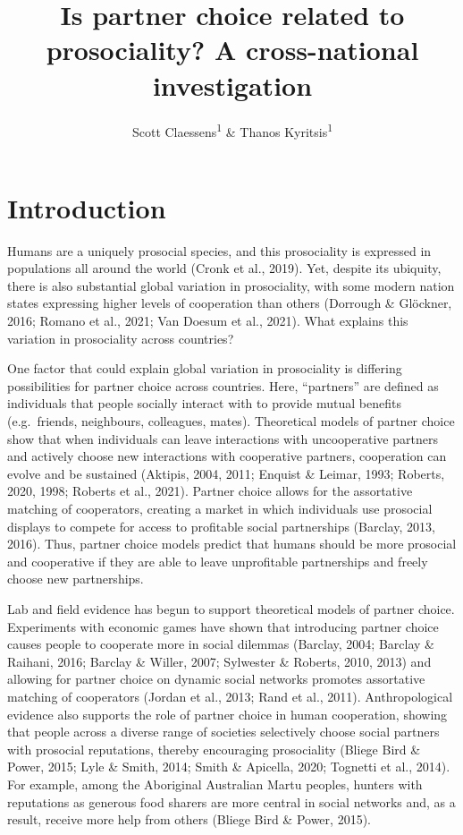 \documentclass[english,man,floatsintext]{apa6}
\title{Is partner choice related to prosociality? A cross-national investigation}
\author{Scott Claessens\textsuperscript{1} \& Thanos Kyritsis\textsuperscript{1}}
\date{}
\affiliation{\vspace{0.5cm}\textsuperscript{1} School of Psychology, University of Auckland, Auckland, New Zealand}
\begin{document}
\maketitle

\hypertarget{introduction}{%
\section{Introduction}\label{introduction}}

Humans are a uniquely prosocial species, and this prosociality is expressed in populations all around the world (Cronk et al., 2019). Yet, despite its ubiquity, there is also substantial global variation in prosociality, with some modern nation states expressing higher levels of cooperation than others (Dorrough \& Glöckner, 2016; Romano et al., 2021; Van Doesum et al., 2021). What explains this variation in prosociality across countries?

One factor that could explain global variation in prosociality is differing possibilities for partner choice across countries. Here, \enquote{partners} are defined as individuals that people socially interact with to provide mutual benefits (e.g.~friends, neighbours, colleagues, mates). Theoretical models of partner choice show that when individuals can leave interactions with uncooperative partners and actively choose new interactions with cooperative partners, cooperation can evolve and be sustained (Aktipis, 2004, 2011; Enquist \& Leimar, 1993; Roberts, 2020, 1998; Roberts et al., 2021). Partner choice allows for the assortative matching of cooperators, creating a market in which individuals use prosocial displays to compete for access to profitable social partnerships (Barclay, 2013, 2016). Thus, partner choice models predict that humans should be more prosocial and cooperative if they are able to leave unprofitable partnerships and freely choose new partnerships.

Lab and field evidence has begun to support theoretical models of partner choice. Experiments with economic games have shown that introducing partner choice causes people to cooperate more in social dilemmas (Barclay, 2004; Barclay \& Raihani, 2016; Barclay \& Willer, 2007; Sylwester \& Roberts, 2010, 2013) and allowing for partner choice on dynamic social networks promotes assortative matching of cooperators (Jordan et al., 2013; Rand et al., 2011). Anthropological evidence also supports the role of partner choice in human cooperation, showing that people across a diverse range of societies selectively choose social partners with prosocial reputations, thereby encouraging prosociality (Bliege Bird \& Power, 2015; Lyle \& Smith, 2014; Smith \& Apicella, 2020; Tognetti et al., 2014). For example, among the Aboriginal Australian Martu peoples, hunters with reputations as generous food sharers are more central in social networks and, as a result, receive more help from others (Bliege Bird \& Power, 2015).
\end{document}
